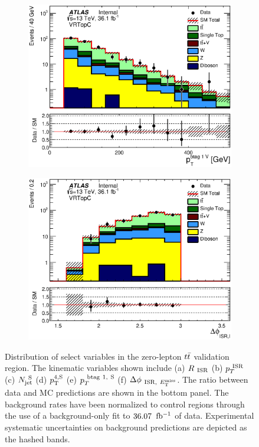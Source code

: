 \begin{figure}[h!]
\begin{subfigure}[b]{0.40\textwidth}
	    \includegraphics[width=\textwidth]{figures/ttbar/postfit/CA_pTbV1_VRTopC_log}
               \caption{ }
    \end{subfigure}
    	\begin{subfigure}[b]{0.40\textwidth}  
	    \includegraphics[width=\textwidth]{figures/ttbar/postfit/CA_dphiISRI_VRTopC_log}
               \caption{ }
    \end{subfigure}
      \caption[Distribution of select variables in the zero-lepton $\ttbar$ validation region]{Distribution of select variables in the zero-lepton $\ttbar$ validation region.  The kinematic variables shown include (a) $R_{~\mathrm{ISR}}$ (b) $p_{T}^{~\mathrm{ISR}}$ (c) $N_{\mathrm{jet}}^{~\mathrm{S}}$ (d) $p_{\mathrm{T}}^{4,\mathrm{S}}$ (e) $p_{T}^{~\mathrm{btag~1,~S}}$ (f) $\Delta\phi_{~\mathrm{ISR},~E_{\mathrm{T}}^{\mathrm{miss}}}$. The ratio between data and MC predictions are shown in the bottom panel.  The background rates have been normalized to control regions through the use of a background-only fit to $36.07$ $\mbox{fb$^{-1}$}$ of data.  Experimental systematic uncertainties on background predictions are depicted as the hashed bands. }
\label{fig:ttbar0Lep1bVRISR}
\end{figure}

